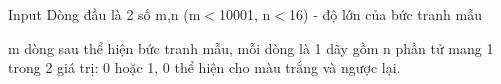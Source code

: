 Input
Dòng đầu là 2 số m,n (m$<$10001, n$<$16) - độ lớn của bức tranh mẫu  

   m dòng sau thể hiện bức tranh mẫu, mỗi dòng là 1 dãy gồm n phần tử mang 1 trong 2 giá trị: 0 hoặc 1, 0 thể hiện cho màu trắng và ngược lại.